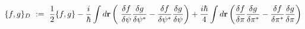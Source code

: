 \begin{equation}
\{f,g\}_{D}\ :=\ {\frac{1}{2}}\{f,g\}-{\frac{i}{\hbar }}\int d{\bf r}\left( {%
\ \frac{\delta f}{\delta \psi }}{\frac{\delta g}{\delta \psi ^{\ast }}}-{%
\frac{\delta f}{\delta \psi ^{\ast }}}{\frac{\delta g}{\delta \psi }}\right)
+{\frac{i\hbar }{4}}\int d{\bf r}\left( {\frac{\delta f}{\delta \pi }}{\frac{%
\delta g}{\delta \pi ^{\ast }}}-{\frac{\delta f}{\delta \pi ^{\ast }}}{\frac{%
\delta g}{\delta \pi }}\right)   \label{DBexpl}
\end{equation}%
